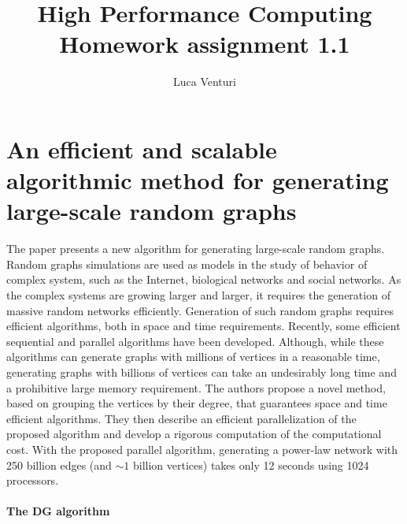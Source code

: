 \documentclass[a4paper,11pt]{article}
\theoremstyle{definition}
\theoremstyle{plain}
\theoremstyle{remark}
\begin{document}
\title{High Performance Computing \\ Homework assignment 1.1}
\author{Luca Venturi}
\maketitle

\section*{An efficient and scalable algorithmic method for generating large-scale random graphs}

The paper \cite{alam:random} presents a new algorithm for generating large-scale random graphs. 
Random graphs simulations are used as models in the study of behavior of complex system, such as the Internet, biological networks and social networks. 
As the complex systems are growing larger and larger, it requires the generation of massive random networks efficiently. Generation of such random graphs requires efficient algorithms, both in space and time requirements. Recently, some efficient sequential and parallel algorithms have been developed.
Although, while these algorithms can generate graphs with millions of vertices in a reasonable time, generating graphs with billions of vertices can take an undesirably long time and a prohibitive large memory requirement.     
The authors propose a novel method, based on grouping the vertices by their degree, that guarantees space and time efficient algorithms. They then describe an efficient parallelization of the proposed algorithm and develop a rigorous computation of the computational cost.
With the proposed parallel algorithm, generating a power-law network with 250 billion edges (and $\sim1$ billion vertices) takes only 12 seconds using 1024 processors. 

\paragraph*{The DG algorithm}
\end{document}
